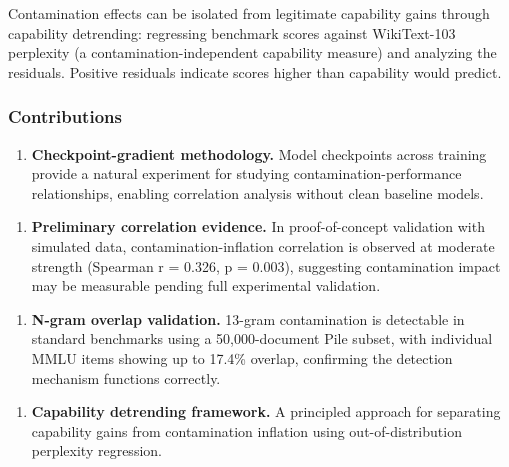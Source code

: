 Contamination effects can be isolated from legitimate capability gains through capability detrending: regressing benchmark scores against WikiText-103 perplexity (a contamination-independent capability measure) and analyzing the residuals. Positive residuals indicate scores higher than capability would predict.

\subsubsection{Contributions}

\begin{enumerate}
\item \textbf{Checkpoint-gradient methodology.} Model checkpoints across training provide a natural experiment for studying contamination-performance relationships, enabling correlation analysis without clean baseline models.
\end{enumerate}

\begin{enumerate}
\item \textbf{Preliminary correlation evidence.} In proof-of-concept validation with simulated data, contamination-inflation correlation is observed at moderate strength (Spearman r = 0.326, p = 0.003), suggesting contamination impact may be measurable pending full experimental validation.
\end{enumerate}

\begin{enumerate}
\item \textbf{N-gram overlap validation.} 13-gram contamination is detectable in standard benchmarks using a 50,000-document Pile subset, with individual MMLU items showing up to 17.4\% overlap, confirming the detection mechanism functions correctly.
\end{enumerate}

\begin{enumerate}
\item \textbf{Capability detrending framework.} A principled approach for separating capability gains from contamination inflation using out-of-distribution perplexity regression.
\end{enumerate}

